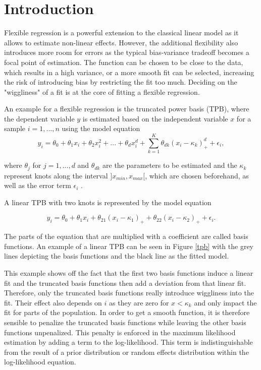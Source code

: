 \documentclass[12pt]{article}
\begin{document}
\begin{titlepage}
\clearpage
\end{titlepage}

\setcounter{page}{2}
\tableofcontents
\clearpage

\section{Introduction}\label{intro}

Flexible regression is a powerful extension to the classical linear model as it allows to estimate non-linear effects. However, the additional flexibility also introduces more room for errors as the typical bias-variance tradeoff becomes a focal point of estimation. The function can be chosen to be close to the data, which results in a high variance, or a more smooth fit can be selected,  increasing the risk of introducing bias by restricting the fit too much. Deciding on the "wiggliness" of a fit is at the core of fitting a flexible regression.

An example for a flexible regression is the truncated power basis (TPB), where the dependent variable $y$ is estimated based on the independent variable $x$ for a sample $i=1,...,n$ using the model equation
$$y_i = 
 \theta_0 + \theta_1x_i + \theta_2x_i^2 + ... + \theta_dx_i^d + \sum_{k=1}^K \theta_{dk}(x_i-\kappa_k)_+^d +\epsilon_i,$$
 
 where $\theta_j$ for $j= 1,...,d$ and $\theta_{dk}$ are the parameters to be estimated and the $\kappa_k$ represent knots along the interval $]x_{min},x_{max}[$, which are chosen beforehand, as well as the error term $\epsilon_i$ \cite{ruppert2003semiparametric, wand2003smoothing}.
 
  A linear TPB with two knots is represented by the model equation
 
 $$y_i = 
 \theta_0 + \theta_1x_i +  \theta_{21}(x_i-\kappa_1)_+ + \theta_{22}(x_i-\kappa_2)_+ + \epsilon_i.$$
 
 The parts of the equation that are multiplied with a coefficient are called basis functions. 
An example of a linear TPB can be seen in Figure \ref{tpb} with the grey lines depicting the basis functions and the black line as the fitted model.
 
This example shows off the fact that the first two basis functions induce a linear fit and the truncated basis functions then add a deviation from that linear fit. Therefore, only the truncated basis functions really introduce wiggliness into the fit. 
Their effect also depends on $i$ as they are zero for $x<\kappa_k$ and only impact the fit for parts of the population. 
In order to get a smooth function, it is therefore sensible to penalize the truncated basis functions while leaving the other basis functions unpenalized. This penalty is enforced in the maximum likelihood estimation by adding a term to the log-likelihood. This term is indistinguishable  from the result of a prior distribution or random effects distribution within the log-likelihood equation. 
\end{document}
